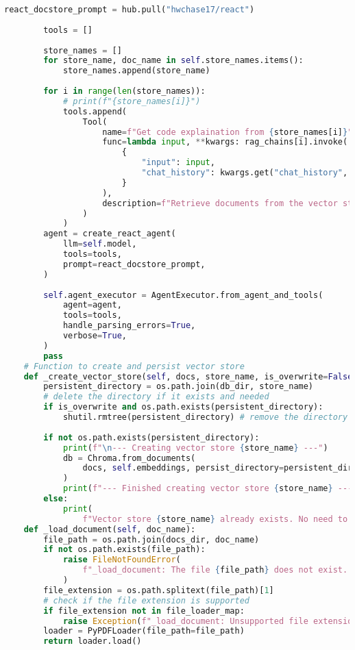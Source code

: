 \begin{lstlisting}[language=Python, caption={$\texttt{AI\_Agent}$ class.}, label={lst:12}]
        react_docstore_prompt = hub.pull("hwchase17/react")
        
        tools = []
        
        store_names = []
        for store_name, doc_name in self.store_names.items():
            store_names.append(store_name)
        
        for i in range(len(store_names)):
            # print(f"{store_names[i]}")
            tools.append(
                Tool(
                    name=f"Get code explaination from {store_names[i]}",
                    func=lambda input, **kwargs: rag_chains[i].invoke(
                        {
                            "input": input, 
                            "chat_history": kwargs.get("chat_history", [])
                        }
                    ),
                    description=f"Retrieve documents from the vector store {store_names[i]}",
                )
            )
        agent = create_react_agent(
            llm=self.model,
            tools=tools,
            prompt=react_docstore_prompt,
        )
        
        self.agent_executor = AgentExecutor.from_agent_and_tools(
            agent=agent, 
            tools=tools, 
            handle_parsing_errors=True, 
            verbose=True,
        )
        pass
    # Function to create and persist vector store
    def _create_vector_store(self, docs, store_name, is_overwrite=False) -> None:
        persistent_directory = os.path.join(db_dir, store_name)
        # delete the directory if it exists and needed
        if is_overwrite and os.path.exists(persistent_directory):
            shutil.rmtree(persistent_directory) # remove the directory
            
        if not os.path.exists(persistent_directory):
            print(f"\n--- Creating vector store {store_name} ---")
            db = Chroma.from_documents(
                docs, self.embeddings, persist_directory=persistent_directory
            )
            print(f"--- Finished creating vector store {store_name} ---")
        else:
            print(
                f"Vector store {store_name} already exists. No need to initialize.")
    def _load_document(self, doc_name):
        file_path = os.path.join(docs_dir, doc_name)
        if not os.path.exists(file_path):
            raise FileNotFoundError(
                f"_load_document: The file {file_path} does not exist. Please check the path."
            )
        file_extension = os.path.splitext(file_path)[1]
        # check if the file extension is supported
        if file_extension not in file_loader_map:
            raise Exception(f"_load_document: Unsupported file extension: {file_extension} for file: {file_path}")
        loader = PyPDFLoader(file_path=file_path)
        return loader.load()
    

\end{lstlisting}
